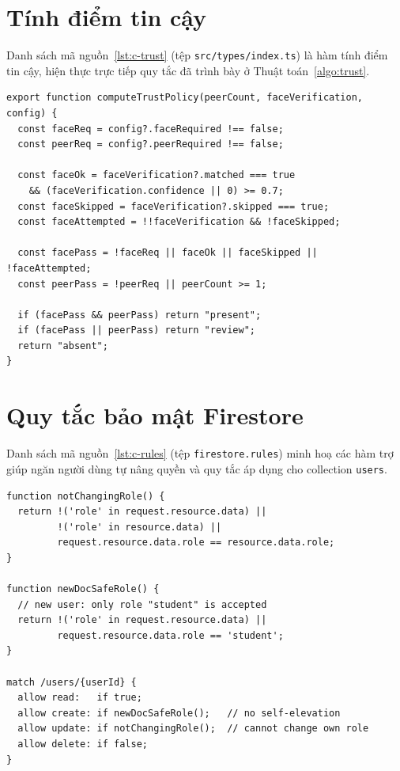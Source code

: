 \documentclass[../main.tex]{subfiles}
\begin{document}
\section{Tính điểm tin cậy}

Danh sách mã nguồn~\ref{lst:c-trust} (tệp \texttt{src/types/index.ts}) là hàm tính điểm tin cậy, hiện
thực trực tiếp quy tắc đã trình bày ở Thuật toán~\ref{algo:trust}.

\begin{lstlisting}[caption={computeTrustPolicy --- tính điểm tin cậy},captionpos=b,label=lst:c-trust]
export function computeTrustPolicy(peerCount, faceVerification, config) {
  const faceReq = config?.faceRequired !== false;
  const peerReq = config?.peerRequired !== false;

  const faceOk = faceVerification?.matched === true
    && (faceVerification.confidence || 0) >= 0.7;
  const faceSkipped = faceVerification?.skipped === true;
  const faceAttempted = !!faceVerification && !faceSkipped;

  const facePass = !faceReq || faceOk || faceSkipped || !faceAttempted;
  const peerPass = !peerReq || peerCount >= 1;

  if (facePass && peerPass) return "present";
  if (facePass || peerPass) return "review";
  return "absent";
}
\end{lstlisting}

\section{Quy tắc bảo mật Firestore}

Danh sách mã nguồn~\ref{lst:c-rules} (tệp \texttt{firestore.rules}) minh hoạ các hàm trợ giúp ngăn người
dùng tự nâng quyền và quy tắc áp dụng cho collection \texttt{users}.

\begin{lstlisting}[caption={firestore.rules --- chống tự nâng quyền},captionpos=b,label=lst:c-rules]
function notChangingRole() {
  return !('role' in request.resource.data) ||
         !('role' in resource.data) ||
         request.resource.data.role == resource.data.role;
}

function newDocSafeRole() {
  // new user: only role "student" is accepted
  return !('role' in request.resource.data) ||
         request.resource.data.role == 'student';
}

match /users/{userId} {
  allow read:   if true;
  allow create: if newDocSafeRole();   // no self-elevation
  allow update: if notChangingRole();  // cannot change own role
  allow delete: if false;
}
\end{lstlisting}
\end{document}
